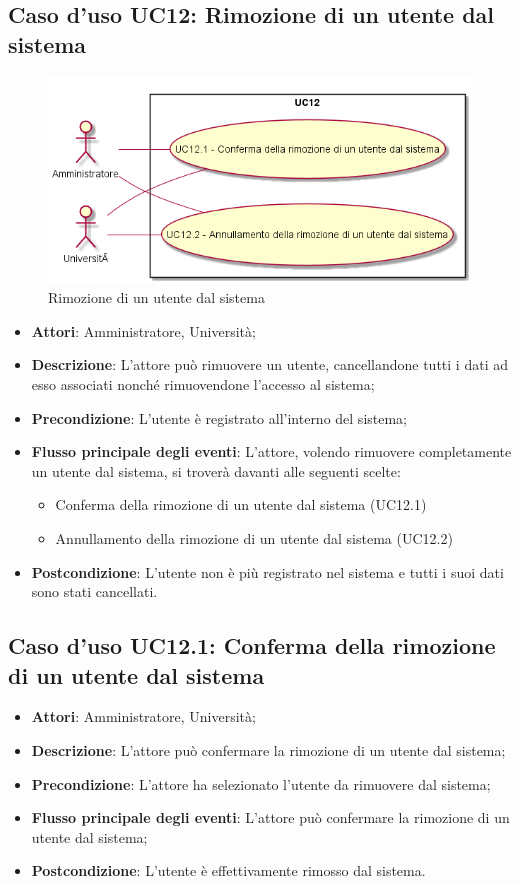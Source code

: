 \subsection{Caso d'uso \texorpdfstring{UC12}{UC12}: Rimozione di un utente dal sistema}
\begin{figure} [H]
\centering
\includegraphics[scale=0.45]{./img/UC12.png}
\caption{Rimozione di un utente dal sistema}\label{}
\end{figure}
\begin{itemize}
\item \textbf{Attori}: Amministratore, Università;
\item \textbf{Descrizione}: L'attore può rimuovere un utente, cancellandone tutti i dati ad esso associati nonché rimuovendone l'accesso al sistema;
\item \textbf{Precondizione}: L'utente è registrato all'interno del sistema;
\item \textbf{Flusso principale degli eventi}: L'attore, volendo rimuovere completamente un utente dal sistema, si troverà davanti alle seguenti scelte:
\begin{itemize}
\item Conferma della rimozione di un utente dal sistema (UC12.1)
\item Annullamento della rimozione di un utente dal sistema (UC12.2)
\end{itemize}
\item \textbf{Postcondizione}: L'utente non è più registrato nel sistema e tutti i suoi dati sono stati cancellati.
\end{itemize}
\subsection{Caso d'uso \texorpdfstring{UC12.1}{UC12.1}: Conferma della rimozione di un utente dal sistema}
\begin{itemize}
\item \textbf{Attori}: Amministratore, Università;
\item \textbf{Descrizione}: L'attore può confermare la rimozione di un utente dal sistema;
\item \textbf{Precondizione}: L'attore ha selezionato l'utente da rimuovere dal sistema;
\item \textbf{Flusso principale degli eventi}: L'attore può confermare la rimozione di un utente dal sistema;
\item \textbf{Postcondizione}: L'utente è effettivamente rimosso dal sistema.
\end{itemize}
